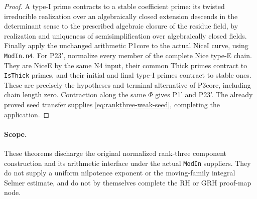 \begin{proof}
A type-I prime contracts to a stable coefficient prime: its twisted
irreducible realization over an algebraically closed extension
descends in the determinant sense to the prescribed algebraic closure
of the residue field, by realization and uniqueness of semisimplification
over algebraically closed fields.\cite{support-chenevier}
Finally apply the unchanged arithmetic P1core to the actual NiceI
curve, using \texttt{ModIn.n4}.  For P23', normalize every member
of the complete Nice type-E chain.  They are NiceE by the same N4
input, their common Thick primes contract to \texttt{IsThick}
primes, and their initial and final type-I primes contract to stable
ones.  These are precisely the hypotheses and terminal alternative
of P3core, including chain length zero.  Contraction along the
same $\Phi$ gives P1' and P23'.
The already proved seed transfer supplies
\eqref{eq:rankthree-weak-seed}, completing the application.
\end{proof}

\paragraph{Scope.}
These theorems discharge the original normalized rank-three component
construction and its arithmetic interface under the actual
\texttt{ModIn} suppliers.  They do not supply a uniform nilpotence
exponent or the moving-family integral Selmer estimate, and do not
by themselves complete the RH or GRH proof-map node.
